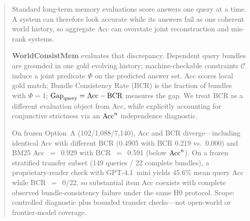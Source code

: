 \begin{abstract}
Standard long-term memory evaluations score answers one query at a time. A system can therefore look accurate while its answers fail as one coherent world history, so aggregate Acc can overstate joint reconstruction and mis-rank systems.

\textbf{WorldConsistMem} evaluates that discrepancy. Dependent query bundles are grounded in one gold evolving history; machine-checkable constraints $\mathcal{C}$ induce a joint predicate $\Phi$ on the predicted answer set. Acc scores local gold match; Bundle Consistency Rate (BCR) is the fraction of bundles with $\Phi=1$; $\Gapq=\Acc-\BCR$ measures the gap. We treat BCR as a different evaluation object from Acc, while explicitly accounting for conjunctive strictness via an $\Acc^{n}$ independence diagnostic.

On frozen Option~A (102/1{,}088/7{,}140), Acc and BCR diverge---including identical Acc with different BCR (0.4905 with BCR 0.219 vs.\ 0.000) and BM25 Acc~$=$~0.929 with BCR~$=$~0.591 (below $\Acc^{n}$). On a frozen stratified transfer subset (149 queries / 22 complete bundles), a proprietary-reader check with GPT-4.1~mini yields 45.6\% mean query Acc while BCR~$=$~0/22, so substantial item Acc coexists with complete observed bundle-consistency failure under the same H0 protocol. Scope: controlled diagnostic plus bounded transfer checks---not open-world or frontier-model coverage.
\end{abstract}
